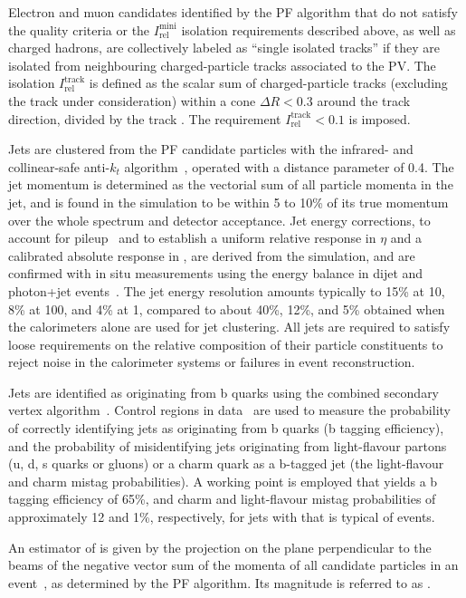 Electron and muon candidates identified by the PF algorithm that do
not satisfy the quality criteria or the $I^\text{mini}_\text{rel}$
isolation requirements described above, as well as charged hadrons,
are collectively labeled as ``single isolated tracks'' if they are
isolated from neighbouring charged-particle tracks associated to the
PV. The isolation $I^\text{track}_\text{rel}$ is defined as the scalar
\Pt sum of charged-particle tracks (excluding the track under
consideration) within a cone $\Delta R < 0.3$ around the track
direction, divided by the track \Pt. The requirement
$I^\text{track}_\text{rel} < 0.1$ is imposed.

Jets are clustered from the PF candidate particles with the infrared-
and collinear-safe anti-$k_t$ algorithm~\cite{antikt}, operated with a
distance parameter of 0.4. The jet momentum is determined as the
vectorial sum of all particle momenta in the jet, and is found in the
simulation to be within 5 to 10\% of its true momentum over the whole
\pt spectrum and detector acceptance. Jet energy corrections, to
account for pileup~\cite{pileup} and to establish a uniform relative
response in $\eta$ and a calibrated absolute response in \Pt, are
derived from the simulation, and are confirmed with in situ
measurements using the energy balance in dijet and photon+jet
events~\cite{Chatrchyan:2011ds}. The jet energy resolution amounts
typically to 15\% at 10\GeV, 8\% at 100\GeV, and 4\% at 1\TeV,
compared to about 40\%, 12\%, and 5\% obtained when the calorimeters
alone are used for jet clustering.
All jets are required to satisfy loose requirements on the relative
composition of their particle constituents to reject noise in the
calorimeter systems or failures in event reconstruction.

Jets are identified as originating from b quarks using the combined
secondary vertex algorithm~\cite{CMS-PAS-BTV-12-001}. Control regions
in data~\cite{bjets} are used to measure the probability of correctly
identifying jets as originating from b quarks (b tagging efficiency),
and the probability of misidentifying jets originating from
light-flavour partons (u, d, s quarks or gluons) or a charm quark as a
b-tagged jet (the light-flavour and charm mistag probabilities). A
working point is employed that yields a b tagging efficiency of 65\%,
and charm and light-flavour mistag probabilities of approximately 12
and 1\%, respectively, for jets with \Pt that is typical of \ttbar
events.

An estimator of \ptvecmiss is given by the projection on the plane
perpendicular to the beams of the negative vector sum of the momenta
of all candidate particles in an event~\cite{cms-met}, as determined
by the PF algorithm. Its magnitude is referred to as \ETmiss.

